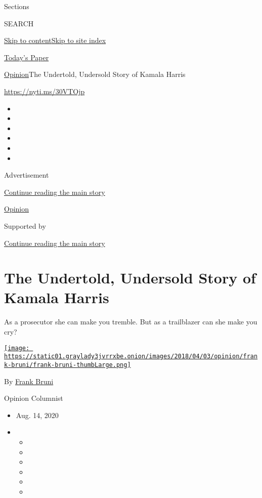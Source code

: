 Sections

SEARCH

\protect\hyperlink{site-content}{Skip to
content}\protect\hyperlink{site-index}{Skip to site index}

\href{https://myaccount.nytimes3xbfgragh.onion/auth/login?response_type=cookie\&client_id=vi}{}

\href{https://www.nytimes3xbfgragh.onion/section/todayspaper}{Today's
Paper}

\href{/section/opinion}{Opinion}\textbar{}The Undertold, Undersold Story
of Kamala Harris

\url{https://nyti.ms/30VTOjp}

\begin{itemize}
\item
\item
\item
\item
\item
\item
\end{itemize}

Advertisement

\protect\hyperlink{after-top}{Continue reading the main story}

\href{/section/opinion}{Opinion}

Supported by

\protect\hyperlink{after-sponsor}{Continue reading the main story}

\hypertarget{the-undertold-undersold-story-of-kamala-harris}{%
\section{The Undertold, Undersold Story of Kamala
Harris}\label{the-undertold-undersold-story-of-kamala-harris}}

As a prosecutor she can make you tremble. But as a trailblazer can she
make you cry?

\href{https://www.nytimes3xbfgragh.onion/by/frank-bruni}{\texttt{[image: https://static01.graylady3jvrrxbe.onion/images/2018/04/03/opinion/frank-bruni/frank-bruni-thumbLarge.png]}}

By \href{https://www.nytimes3xbfgragh.onion/by/frank-bruni}{Frank Bruni}

Opinion Columnist

\begin{itemize}
\item
  Aug. 14, 2020
\item
  \begin{itemize}
  \item
  \item
  \item
  \item
  \item
  \item
  \end{itemize}
\end{itemize}

